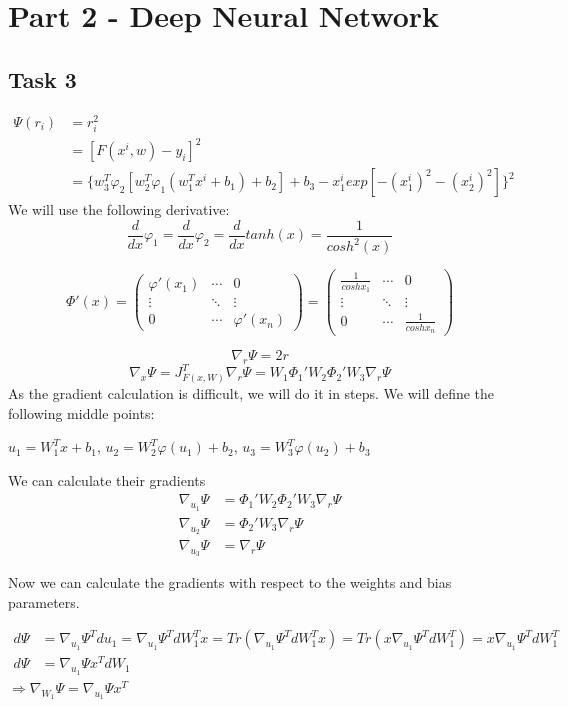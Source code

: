 \documentclass[12pt]{scrartcl}
\begin{document}
\section*{Part 2 - Deep Neural Network}
\subsection*{Task 3}
\begin{align*}
\Psi(r_i)&=r_i^2\\
&=[F(x^i,w)-y_i]^2\\
&=\{w_3^T\varphi_2[w_2^T\varphi_1(w_1^Tx^i+b_1)+b_2]+b_3 -x_1^i exp[-(x_1^i)^2-(x_2^i)^2]\}^2
\end{align*}
We will use the following derivative:
$$\frac{d}{dx}\varphi_1=\frac{d}{dx}\varphi_2=\frac{d}{dx}tanh(x)=
\frac{1}{cosh^2(x)}$$

$$\Phi'(x)=
\begin{pmatrix}
\varphi'(x_1) & \cdots & 0 \\
\vdots & \ddots & \vdots \\
0 & \cdots & \varphi'(x_n)
\end{pmatrix}
=
\begin{pmatrix}
\frac{1}{cosh x_1} & \cdots & 0 \\
\vdots & \ddots & \vdots \\
0 & \cdots & \frac{1}{cosh x_n}
\end{pmatrix}$$

$$\nabla_r \Psi = 2r$$
$$\nabla_x \Psi = J^T_{F(x, W)}\nabla_r \Psi = 
W_1\Phi_1'W_2\Phi_2'W_3\nabla_r \Psi$$
As the gradient calculation is difficult, we will do it in steps. We will define the following middle points:
\begin{center}
$u_1 = W_1^Tx+b_1$, $u_2 = W_2^T\varphi(u_1)+b_2$, $u_3 = W_3^T\varphi(u_2)+b_3$
\end{center}
We can calculate their gradients
\begin{align*}
\nabla_{u_1} \Psi &= \Phi_1'W_2\Phi_2'W_3\nabla_r \Psi \\
\nabla_{u_2} \Psi &= \Phi_2'W_3\nabla_r \Psi \\
\nabla_{u_3} \Psi &= \nabla_r \Psi
\end{align*}

Now we can calculate the gradients with respect to the weights and bias parameters.

\begin{align*}
d\Psi &= \nabla_{u_1}\Psi^Tdu_1=\nabla_{u_1}\Psi^T dW_1^Tx
=Tr(\nabla_{u_1}\Psi^T dW_1^Tx)=Tr(x\nabla_{u_1}\Psi^T dW_1^T)
=x\nabla_{u_1}\Psi^T dW_1^T\\
d\Psi &= \nabla_{u_1}\Psi x^TdW_1 
\end{align*}
$\Rightarrow \nabla_{W_1}\Psi = \nabla_{u_1}\Psi x^T$
\begin{center}
\end{center}
\end{document}

